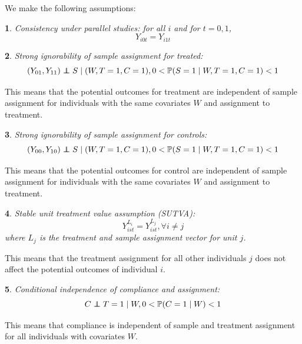 \documentclass[12pt]{article}
\makeatletter
\newtheorem*{assumption*}{\assumptionnumber}
\providecommand{\assumptionnumber}{}
\newenvironment{assumption}[2]
 {%
  \renewcommand{\assumptionnumber}{Assumption #1}%
  \begin{assumption*}%
  \protected@edef\@currentlabel{#1}%
 }
 {%
  \end{assumption*}
 }
\newcommand{\pr}{\mathbb{P}} %
\newcommand\independent{\protect\mathpalette{\protect\independenT}{\perp}}
\def\independenT#1#2{\mathrel{\rlap{$#1#2$}\mkern2mu{#1#2}}}
\makeatother
\begin{document}
We make the following assumptions:
\begin{assumption}{1}{}\label{consistency}
Consistency under parallel studies: for all $i$ and for $t=0, 1$,
$$Y_{i0t} = Y_{i1t}$$
\end{assumption}

\begin{assumption}{2}{}\label{si_treat}
Strong ignorability of sample assignment for treated:
\begin{equation*}
(Y_{01}, Y_{11}) \independent S \mid (W, T=1,C = 1), 0 < \pr(S=1 \mid W, T=1,C = 1) <1 
\end{equation*}
\end{assumption}
\noindent This means that the potential outcomes for treatment are independent of sample assignment for individuals with the same covariates $W$ and assignment to treatment.

\begin{assumption}{3}{}\label{si_ctrl}
Strong ignorability of sample assignment for controls:
\begin{equation*}
(Y_{00}, Y_{10}) \independent S \mid (W, T=1,C = 1), 0 < \pr(S=1 \mid W, T=1,C = 1) <1 
\end{equation*}\end{assumption}

\noindent This means that the potential outcomes for control are independent of sample assignment for individuals with the same covariates $W$ and assignment to treatment.

\begin{assumption}{4}{}\label{sutva}
Stable unit treatment value assumption (SUTVA):
\begin{equation*}
Y_{ist}^{L_i} = Y_{ist}^{L_j},  \forall i \neq j
\end{equation*}
where $L_j$ is the treatment and sample assignment vector for unit $j$. \end{assumption}
\noindent This means that the treatment assignment for all other individuals $j$ does not affect the potential outcomes of individual $i$.
 
\begin{assumption}{5}{}\label{compl}
Conditional independence of compliance and assignment:
\begin{equation*}
C \independent T=1 \mid W, 0 < \pr(C = 1 \mid W) < 1
\end{equation*}
\end{assumption}
\noindent This means that compliance is independent of sample and treatment assignment for all individuals with covariates $W$.
\end{document}
